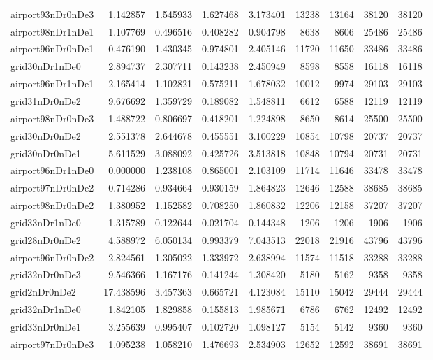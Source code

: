\begin{longtable}{|l|r|r|r|r|r|r|r|r|}
airport93nDr0nDe3 & 1.142857 & 1.545933 & 1.627468 & 3.173401 & 13238 & 13164 & 38120 & 38120 \\
airport98nDr1nDe1 & 1.107769 & 0.496516 & 0.408282 & 0.904798 & 8638 & 8606 & 25486 & 25486 \\
airport96nDr0nDe1 & 0.476190 & 1.430345 & 0.974801 & 2.405146 & 11720 & 11650 & 33486 & 33486 \\
grid30nDr1nDe0 & 2.894737 & 2.307711 & 0.143238 & 2.450949 & 8598 & 8558 & 16118 & 16118 \\
airport96nDr1nDe1 & 2.165414 & 1.102821 & 0.575211 & 1.678032 & 10012 & 9974 & 29103 & 29103 \\
grid31nDr0nDe2 & 9.676692 & 1.359729 & 0.189082 & 1.548811 & 6612 & 6588 & 12119 & 12119 \\
airport98nDr0nDe3 & 1.488722 & 0.806697 & 0.418201 & 1.224898 & 8650 & 8614 & 25500 & 25500 \\
grid30nDr0nDe2 & 2.551378 & 2.644678 & 0.455551 & 3.100229 & 10854 & 10798 & 20737 & 20737 \\
grid30nDr0nDe1 & 5.611529 & 3.088092 & 0.425726 & 3.513818 & 10848 & 10794 & 20731 & 20731 \\
airport96nDr1nDe0 & 0.000000 & 1.238108 & 0.865001 & 2.103109 & 11714 & 11646 & 33478 & 33478 \\
airport97nDr0nDe2 & 0.714286 & 0.934664 & 0.930159 & 1.864823 & 12646 & 12588 & 38685 & 38685 \\
airport98nDr0nDe2 & 1.380952 & 1.152582 & 0.708250 & 1.860832 & 12206 & 12158 & 37207 & 37207 \\
grid33nDr1nDe0 & 1.315789 & 0.122644 & 0.021704 & 0.144348 & 1206 & 1206 & 1906 & 1906 \\
grid28nDr0nDe2 & 4.588972 & 6.050134 & 0.993379 & 7.043513 & 22018 & 21916 & 43796 & 43796 \\
airport96nDr0nDe2 & 2.824561 & 1.305022 & 1.333972 & 2.638994 & 11574 & 11518 & 33288 & 33288 \\
grid32nDr0nDe3 & 9.546366 & 1.167176 & 0.141244 & 1.308420 & 5180 & 5162 & 9358 & 9358 \\
grid2nDr0nDe2 & 17.438596 & 3.457363 & 0.665721 & 4.123084 & 15110 & 15042 & 29444 & 29444 \\
grid32nDr1nDe0 & 1.842105 & 1.829858 & 0.155813 & 1.985671 & 6786 & 6762 & 12492 & 12492 \\
grid33nDr0nDe1 & 3.255639 & 0.995407 & 0.102720 & 1.098127 & 5154 & 5142 & 9360 & 9360 \\
airport97nDr0nDe3 & 1.095238 & 1.058210 & 1.476693 & 2.534903 & 12652 & 12592 & 38691 & 38691 \\

\end{longtable}

